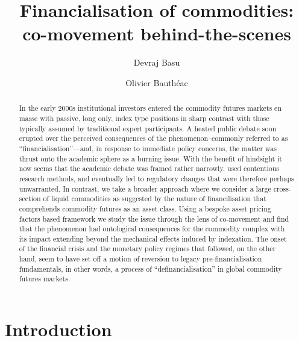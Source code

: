 \documentclass[]{elsarticle} %
\begin{document}
\begin{frontmatter}

  \title{Financialisation of commodities: co-movement behind-the-scenes}
    \author[strath]{Devraj Basu}
    \author[strath]{Olivier Bauthéac}
  
      \address[strath]{University of Strathclyde Business school}
  
  \begin{abstract}
  In the early 2000s institutional investors entered the commodity futures markets en masse with passive, long only, index type positions in sharp contrast with those typically assumed by traditional expert participants. A heated public debate soon erupted over the perceived consequences of the phenomenon--commonly referred to as ``financialisation''---and, in response to immediate policy concerns, the matter was thrust onto the academic sphere as a burning issue. With the benefit of hindsight it now seems that the academic debate was framed rather narrowly, used contentious research methods, and eventually led to regulatory changes that were therefore perhaps unwarranted. In contrast, we take a broader approach where we consider a large cross-section of liquid commodities as suggested by the nature of financilisation that comprehends commodity futures as an asset class. Using a bespoke asset pricing factors based framework we study the issue through the lens of co-movement and find that the phenomenon had ontological consequences for the commodity complex with its impact extending beyond the mechanical effects induced by indexation. The onset of the financial crisis and the monetary policy regimes that followed, on the other hand, seem to have set off a motion of reversion to legacy pre-financialisation fundamentals, in other words, a process of ``definancialisation'' in global commodity futures markets.
  \end{abstract}
  
 \end{frontmatter}

\cleardoublepage

\hypertarget{index}{%
\section{Introduction}\label{index}}
\end{document}
